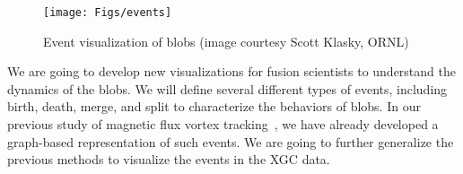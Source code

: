 \begin{figure}[!h]
  \centering
  \texttt{[image: Figs/events]}
  \caption{Event visualization of blobs (image courtesy Scott Klasky, ORNL)}
  \label{fig:events}
\end{figure}

We are going to develop new visualizations for fusion scientists to understand the dynamics of the blobs.  We will define several different types of events, including birth, death, merge, and split to characterize the behaviors of blobs.  In our previous study of magnetic flux vortex tracking~\cite{GuoPPKG16, GuoPG17, PhillipsGPKG16, PhillipsPKG15}, we have already developed a graph-based representation of such events.  We are going to further generalize the previous methods to visualize the events in the XGC data.  

% 


% 

